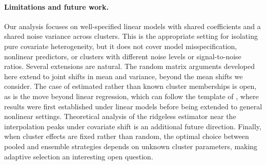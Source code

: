 \documentclass{article}
\theoremstyle{plain}
\theoremstyle{remark}
\begin{document}
\paragraph{Limitations and future work.}
Our analysis focuses on well-specified linear models with shared coefficients and a shared noise variance across clusters. This is the appropriate setting for isolating pure covariate heterogeneity, but it does not cover model misspecification, nonlinear predictors, or clusters with different noise levels or signal-to-noise ratios. Several extensions are natural. The random matrix arguments developed here extend to joint shifts in mean and variance, beyond the mean shifts we consider. The case of estimated rather than known cluster memberships is open, as is the move beyond linear regression, which can follow the template of \cite{hastie2019surprises}\textcolor{black}{,} where results were first established under linear models before being extended to general nonlinear settings. Theoretical analysis of the ridgeless estimator near the interpolation peaks under covariate shift is an additional future direction. Finally, when cluster effects are fixed rather than random, the optimal choice between pooled and ensemble strategies depends on unknown cluster parameters, making adaptive selection an interesting open question.

\newpage





\appendix





\end{document}
